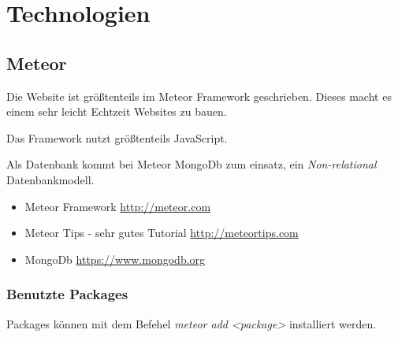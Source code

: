 \documentclass[Info_VK_Website_Dokumentation.tex]{subfiles}
\begin{document}
	
\chapter{Technologien}

\section{Meteor} 

Die Website ist größtenteils im Meteor Framework geschrieben. Dieses macht es einem sehr leicht Echtzeit Websites zu bauen.

Das Framework nutzt größtenteils JavaScript.

Als Datenbank kommt bei Meteor MongoDb zum einsatz, ein \emph{Non-relational} Datenbankmodell.

\begin{itemize}
 	\item Meteor Framework \url{http://meteor.com} \\
 	\item Meteor Tips - sehr gutes Tutorial \url{http://meteortips.com} \\
 	\item MongoDb \url{https://www.mongodb.org} \\ 
\end{itemize} 

\subsection{Benutzte Packages}

Packages können mit dem Befehel \emph{meteor add <package>} installiert werden.
\end{document}
